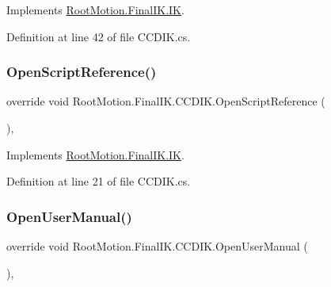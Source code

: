 Implements \mbox{\hyperlink{class_root_motion_1_1_final_i_k_1_1_i_k_ad9ef393e69cd16ba2d6fa06ba06b7a66}{Root\+Motion.\+Final\+I\+K.\+IK}}.



Definition at line 42 of file C\+C\+D\+I\+K.\+cs.

\mbox{\label{class_root_motion_1_1_final_i_k_1_1_c_c_d_i_k_adf8dc52ac72a005efbc193fe59154b06}} 
\subsubsection{\texorpdfstring{Open\+Script\+Reference()}{OpenScriptReference()}}
{\footnotesize\ttfamily override void Root\+Motion.\+Final\+I\+K.\+C\+C\+D\+I\+K.\+Open\+Script\+Reference (\begin{DoxyParamCaption}{ }\end{DoxyParamCaption})\hspace{0.3cm}{\ttfamily [protected]}, {\ttfamily [virtual]}}



Implements \mbox{\hyperlink{class_root_motion_1_1_final_i_k_1_1_i_k_a260f283903b1305b99485c9474c83927}{Root\+Motion.\+Final\+I\+K.\+IK}}.



Definition at line 21 of file C\+C\+D\+I\+K.\+cs.

\mbox{\label{class_root_motion_1_1_final_i_k_1_1_c_c_d_i_k_a338aeec4a93d1b623f9a20a9e03b9677}} 
\subsubsection{\texorpdfstring{Open\+User\+Manual()}{OpenUserManual()}}
{\footnotesize\ttfamily override void Root\+Motion.\+Final\+I\+K.\+C\+C\+D\+I\+K.\+Open\+User\+Manual (\begin{DoxyParamCaption}{ }\end{DoxyParamCaption})\hspace{0.3cm}{\ttfamily [protected]}, {\ttfamily [virtual]}}



